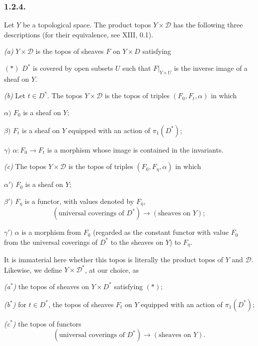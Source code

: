 \subsubsection*{1.2.4.}
Let $Y$ be a topological space.  The product topos
$Y\times\mathcal D$ has the following three descriptions (for their
equivalence, see XIII, 0.1).

\medskip
\noindent\textit{(a)} $Y\times\mathcal D$ is the topos of sheaves
$F$ on $Y\times D$ satisfying

\smallskip
\noindent $(*)$ $D^*$ is covered by open subsets $U$ such that
$F|_{Y\times U}$ is the inverse image of a sheaf on $Y$.

\medskip
\noindent\textit{(b)} Let $t\in D^*$.  The topos
$Y\times\mathcal D$ is the topos of triples $(F_0,F_t,\alpha)$ in
which

\smallskip
\noindent $\alpha)$ $F_0$ is a sheaf on $Y$;

\noindent $\beta)$ $F_t$ is a sheaf on $Y$ equipped with an action
of $\pi_1(D^*)$;

\noindent $\gamma)$ $\alpha:F_0\longrightarrow F_t$ is a morphism
whose image is contained in the invariants.

\medskip
\noindent\textit{(c)} The topos $Y\times\mathcal D$ is the topos of
triples $(F_0,F_\eta,\alpha)$ in which

\smallskip
\noindent $\alpha')$ $F_0$ is a sheaf on $Y$;

\noindent $\beta')$ $F_\eta$ is a functor, with values denoted by
$F_{\bar\eta}$,
\[
(\text{universal coverings of }D^*)
\longrightarrow(\text{sheaves on }Y);
\]

\noindent $\gamma')$ $\alpha$ is a morphism from $F_0$ (regarded as
the constant functor with value $F_0$ from the universal coverings
of $D^*$ to the sheaves on $Y$) to $F_\eta$.

It is immaterial here whether this topos is literally the product
topos of $Y$ and $\mathcal D$.  Likewise, we define
$Y\times\mathcal D^*$, at our choice, as

\medskip
\noindent\textit{(a$^*$)} the topos of sheaves on $Y\times D^*$
satisfying $(*)$;

\noindent\textit{(b$^*$)} for $t\in D^*$, the topos of sheaves $F_t$
on $Y$ equipped with an action of $\pi_1(D^*)$;

\noindent\textit{(c$^*$)} the topos of functors
\[
(\text{universal coverings of }D^*)
\longrightarrow(\text{sheaves on }Y).
\]


